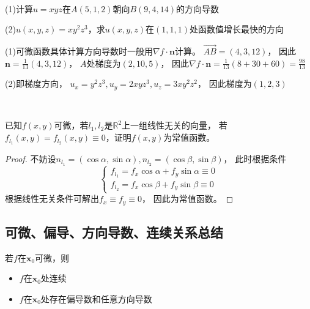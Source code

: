 ~

\begin{exercise}[梯度与方向导数计算]
  (1)计算$u = xyz$在$A(5,1,2)$朝向$B(9,4,14)$的方向导数

  (2)$u(x,y,z) = xy^2z^3$，求$u(x,y,z)$在$(1,1,1)$处函数值增长最快的方向
\end{exercise}

\begin{solution}
  (1)可微函数具体计算方向导数时一般用$\nabla f \cdot \mathbf{n}$计算。
  $\overrightarrow{AB} = (4,3,12)$，
  因此$\mathbf{n} = \frac{1}{13}(4,3,12)$，
  $A$处梯度为$(2,10,5)$，
  因此$\nabla f \cdot \mathbf{n} = \frac{1}{13}(8 + 30 + 60) = \frac{98}{13}$

  (2)即梯度方向，
  $u_x = y^2z^3, u_y = 2xyz^3, u_z = 3xy^2z^2$，
  因此梯度为$(1,2,3)$
\end{solution}

~

\begin{exercise}[方向导数的应用]
  已知$f(x,y)$可微，若$l_1,l_2$是$\mathbb{R}^2$上一组线性无关的向量，
  若$f_{l_1}(x,y) = f_{l_2}(x,y) \equiv 0$，证明$f(x,y)$为常值函数。
\end{exercise}

\begin{proof}
  不妨设$n_{l_1} = (\cos \alpha, \sin \alpha), n_{l_2} = (\cos \beta, \sin \beta)$，
  此时根据条件
  \begin{equation*}
    \begin{cases}
      f_{l_1} = f_x \cos \alpha + f_y \sin \alpha \equiv 0\\
      f_{l_2} = f_x \cos \beta + f_y \sin \beta \equiv 0
    \end{cases}
  \end{equation*}
  根据线性无关条件可解出$f_x \equiv f_y \equiv 0$，
  因此为常值函数。
\end{proof}


\subsection{可微、偏导、方向导数、连续关系总结}

\begin{theorem}[可微的性质]
  若$f$在$\mathbf{x}_0$可微，则
  \begin{itemize}
  \item $f$在$\mathbf{x}_0$处连续
  \item $f$在$\mathbf{x}_0$处存在偏导数和任意方向导数
  \end{itemize}
\end{theorem}

